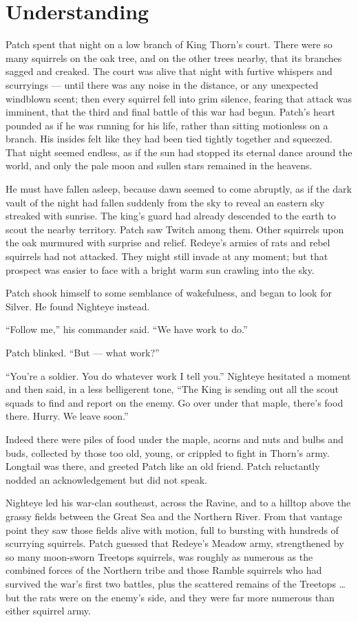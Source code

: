 \documentclass[ebook,oneside,openany,12pt]{memoir}
\begin{document}

\section{Understanding}

Patch spent that night on a low branch of King Thorn’s court. There
were so many squirrels on the oak tree, and on the other trees nearby,
that its branches sagged and creaked. The court was alive that night
with furtive whispers and scurryings — until there was any noise in
the distance, or any unexpected windblown scent; then every squirrel
fell into grim silence, fearing that attack was imminent, that the
third and final battle of this war had begun. Patch’s heart pounded as
if he was running for his life, rather than sitting motionless on a
branch. His insides felt like they had been tied tightly together and
squeezed. That night seemed endless, as if the sun had stopped its
eternal dance around the world, and only the pale moon and sullen
stars remained in the heavens.

He must have fallen asleep, because dawn seemed to come abruptly, as
if the dark vault of the night had fallen suddenly from the sky to
reveal an eastern sky streaked with sunrise. The king’s guard had
already descended to the earth to scout the nearby territory. Patch
saw Twitch among them. Other squirrels upon the oak murmured with
surprise and relief. Redeye’s armies of rats and rebel squirrels had
not attacked. They might still invade at any moment; but that prospect
was easier to face with a bright warm sun crawling into the sky.

Patch shook himself to some semblance of wakefulness, and began to
look for Silver. He found Nighteye instead.

“Follow me,” his commander said. “We have work to do.”

Patch blinked. “But — what work?”

“You’re a soldier. You do whatever work I tell you.” Nighteye
hesitated a moment and then said, in a less belligerent tone, “The
King is sending out all the scout squads to find and report on the
enemy. Go over under that maple, there’s food there. Hurry. We leave
soon.”

Indeed there were piles of food under the maple, acorns and nuts and
bulbs and buds, collected by those too old, young, or crippled to
fight in Thorn’s army. Longtail was there, and greeted Patch like an
old friend. Patch reluctantly nodded an acknowledgement but did not
speak.

Nighteye led his war-clan southeast, across the Ravine, and to a
hilltop above the grassy fields between the Great Sea and the Northern
River. From that vantage point they saw those fields alive with
motion, full to bursting with hundreds of scurrying squirrels. Patch
guessed that Redeye’s Meadow army, strengthened by so many moon-sworn
Treetops squirrels, was roughly as numerous as the combined forces of
the Northern tribe and those Ramble squirrels who had survived the
war’s first two battles, plus the scattered remains of the Treetops …
but the rats were on the enemy’s side, and they were far more numerous
than either squirrel army.
\end{document}
